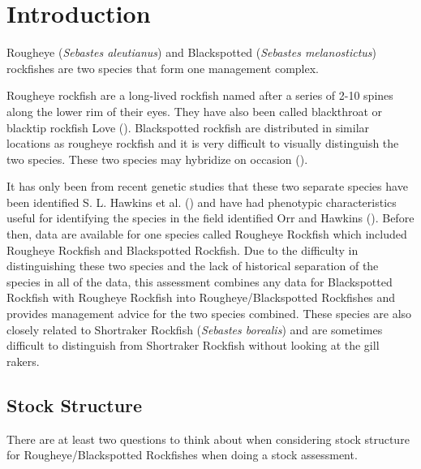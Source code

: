 \documentclass[
]{scrartcl}
\begin{document}
\newpage{}

\setlength{\parskip}{5mm plus1mm minus1mm}
\setcounter{page}{1}
\setcounter{section}{0}
\renewcommand{\thefigure}{\arabic{figure}}
\setcounter{figure}{0}
\renewcommand{\thetable}{\arabic{table}}
\setcounter{table}{0}

\section{Introduction}\label{introduction}

Rougheye (\emph{Sebastes aleutianus}) and Blackspotted (\emph{Sebastes
melanostictus}) rockfishes are two species that form one management
complex.

Rougheye rockfish are a long-lived rockfish named after a series of 2-10
spines along the lower rim of their eyes. They have also been called
blackthroat or blacktip rockfish Love
(). Blackspotted rockfish are
distributed in similar locations as rougheye rockfish and it is very
difficult to visually distinguish the two species. These two species may
hybridize on occasion ().

It has only been from recent genetic studies that these two separate
species have been identified S. L. Hawkins et al.
() and have had phenotypic
characteristics useful for identifying the species in the field
identified Orr and Hawkins ().
Before then, data are available for one species called Rougheye Rockfish
which included Rougheye Rockfish and Blackspotted Rockfish. Due to the
difficulty in distinguishing these two species and the lack of
historical separation of the species in all of the data, this assessment
combines any data for Blackspotted Rockfish with Rougheye Rockfish into
Rougheye/Blackspotted Rockfishes and provides management advice for the
two species combined. These species are also closely related to
Shortraker Rockfish (\emph{Sebastes borealis}) and are sometimes
difficult to distinguish from Shortraker Rockfish without looking at the
gill rakers.

\subsection{Stock Structure}\label{sec-stock_structure}

There are at least two questions to think about when considering stock
structure for Rougheye/Blackspotted Rockfishes when doing a stock
assessment.
\end{document}
